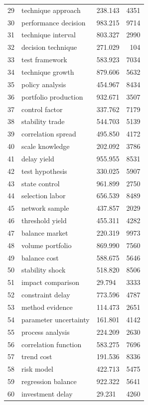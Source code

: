 \documentclass[11pt]{report}
\begin{document}
\begin{longtable}{rllr}
29 & technique approach & 238.143 & 4351 \\
30 & performance decision & 983.215 & 9714 \\
31 & technique interval & 803.327 & 2990 \\
32 & decision technique & 271.029 & 104 \\
33 & test framework & 583.923 & 7034 \\
34 & technique growth & 879.606 & 5632 \\
35 & policy analysis & 454.967 & 8434 \\
36 & portfolio production & 932.671 & 3507 \\
37 & control factor & 337.762 & 7179 \\
38 & stability trade & 544.703 & 5139 \\
39 & correlation spread & 495.850 & 4172 \\
40 & scale knowledge & 202.092 & 3786 \\
41 & delay yield & 955.955 & 8531 \\
42 & test hypothesis & 330.025 & 5907 \\
43 & state control & 961.899 & 2750 \\
44 & selection labor & 656.539 & 8489 \\
45 & network sample & 437.857 & 2029 \\
46 & threshold yield & 455.311 & 4282 \\
47 & balance market & 220.319 & 9973 \\
48 & volume portfolio & 869.990 & 7560 \\
49 & balance cost & 588.675 & 5646 \\
50 & stability shock & 518.820 & 8506 \\
51 & impact comparison & 29.794 & 3333 \\
52 & constraint delay & 773.596 & 4787 \\
53 & method evidence & 114.473 & 2651 \\
54 & parameter uncertainty & 161.801 & 4142 \\
55 & process analysis & 224.209 & 2630 \\
56 & correlation function & 583.275 & 7696 \\
57 & trend cost & 191.536 & 8336 \\
58 & risk model & 422.713 & 5475 \\
59 & regression balance & 922.322 & 5641 \\
60 & investment delay & 29.231 & 4260 \\
\end{longtable}
\end{document}
